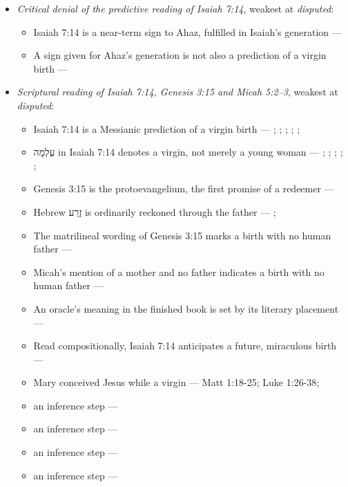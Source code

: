 \documentclass[11pt]{article}
\begin{document}
\begin{itemize}
\item \emph{Critical denial of the predictive reading of Isaiah 7:14}, weakest at \emph{disputed}:
\begin{itemize}
\item Isaiah 7:14 is a near-term sign to Ahaz, fulfilled in Isaiah's generation --- \cite{brown-birth-messiah-1993}
\item A sign given for Ahaz's generation is not also a prediction of a virgin birth --- \cite{brown-birth-messiah-1993}
\end{itemize}
\item \emph{Scriptural reading of Isaiah 7:14, Genesis 3:15 and Micah 5:2–3}, weakest at \emph{disputed}:
\begin{itemize}
\item Isaiah 7:14 is a Messianic prediction of a virgin birth --- \cite[ad loc. Isa 7:14]{motyer-isaiah-1993}; \cite[123]{motyer-context-content-1970}; \cite[12--14]{compton-immanuel-prophecy-2007}; \cite[66]{justin-dialogue-with-trypho-160}; \cite[III.21.6]{irenaeus-against-heresies-180}; \cite[I.35]{origen-against-celsus-248}
\item עַלְמָה in Isaiah 7:14 denotes a virgin, not merely a young woman --- \cite[ad loc. Isa 7:14]{motyer-isaiah-1993}; \cite[app. Isa 7:14]{bhs-1997}; \cite[1653--1654]{berry-virgin-birth-2003}; \cite[125]{motyer-context-content-1970}; \cite[7--8]{compton-immanuel-prophecy-2007}; \cite[I.32]{jerome-against-jovinianus-393}
\item Genesis 3:15 is the protoevangelium, the first promise of a redeemer --- \cite[9--10]{miravalle-meet-mary-2007}
\item Hebrew זֶרַע is ordinarily reckoned through the father --- \cite[9--10]{miravalle-meet-mary-2007}; \cite[app. Gen 3:15]{bhs-1997}
\item The matrilineal wording of Genesis 3:15 marks a birth with no human father --- \cite[9--10]{miravalle-meet-mary-2007}
\item Micah's mention of a mother and no father indicates a birth with no human father --- \cite[9--10]{miravalle-meet-mary-2007}
\item An oracle's meaning in the finished book is set by its literary placement --- \cite[483--486]{postell-isaiah-messianic-2025}
\item Read compositionally, Isaiah 7:14 anticipates a future, miraculous birth --- \cite[490--493]{postell-isaiah-messianic-2025}
\item Mary conceived Jesus while a virgin --- Matt 1:18-25; Luke 1:26-38; \cite[30--33]{brown-problem-virginal-conception-1972}
\item an inference step --- \cite[ad loc. Isa 7:14]{motyer-isaiah-1993}
\item an inference step --- \cite[9--10]{miravalle-meet-mary-2007}
\item an inference step --- \cite[490--493]{postell-isaiah-messianic-2025}
\item an inference step --- \cite[ad loc. Matt 1:23]{france-matthew-2007}
\end{itemize}
\end{itemize}
\end{document}
